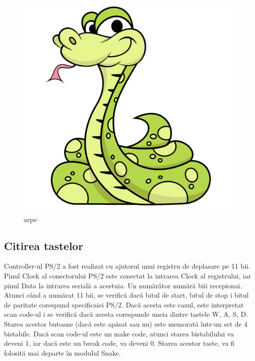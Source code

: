 \documentclass[a4paper,11pt,romanian]{article}
\begin{document}
{ \begin{figure}
  \begin{center}
   \includegraphics[scale=0.2]{snek.png}
   \caption{arpe}
   \label{fig:snake}
  \end{center}
 \end{figure}

\subsection{Citirea tastelor}

Controller-ul PS/2 a fost realizat cu ajutorul unui registru de deplasare pe 11 bii. Pinul Clock al conectorului PS/2 este conectat la intrarea Clock al registrului, iar pinul Data la intrarea serial\u{a} a acestuia.
Un num\u{a}r\u{a}tor num\u{a}r\u{a} biii recepionai. Atunci c\^{a}nd a num\u{a}rat 11 bii, se verific\u{a} dac\u{a} bitul de start, bitul de stop i bitul de paritate corespund specificaiei PS/2.
Dac\u{a} acesta este cazul, este interpretat scan code-ul i se verific\u{a} dac\u{a} acesta corespunde uneia dintre tastele W, A, S, D. Starea acestor butoane (dac\u{a} este ap\u{a}sat sau nu) este memorat\u{a} \^{i}ntr-un set de 4 bistabile.
Dac\u{a} scan code-ul este un make code, atunci starea bistabilului va deveni 1, iar dac\u{a} este un break code, va deveni 0.
Starea acestor taste, va fi folosit\u{a} mai departe \^{i}n modulul Snake.

}
\end{document}
